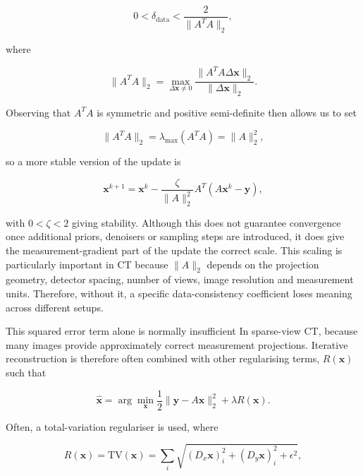 \begin{equation}
0<\delta_{\mathrm{data}}<\frac{2}{\|A^TA\|_2},
\label{eq:data_step_stability}
\end{equation}

where 

\begin{equation}
\|A^TA\|_2
=
\max_{\Delta\mathbf{x}\neq 0}
\frac{
\|A^TA\Delta\mathbf{x}\|_2
}{
\|\Delta\mathbf{x}\|_2
}.
\label{eq:operator_norm_definition}
\end{equation}

Observing that $A^TA$ is symmetric and positive semi-definite then allows us to set 

\begin{equation}
\|A^TA\|_2
=
\lambda_{\max}(A^TA)
=
\|A\|_2^2,
\label{eq:operator_norm_relation}
\end{equation}

so a more stable version of the update is

\begin{equation}
\mathbf{x}^{k+1}
=
\mathbf{x}^k
-
\frac{\zeta}{\|A\|_2^2}
A^T(A\mathbf{x}^k-\mathbf{y}),
\label{eq:scaled_data_consistency_update}
\end{equation}

with $0<\zeta<2$ giving stability. Although this does not guarantee convergence once additional priors, denoisers or sampling steps are introduced, it does give the measurement-gradient part of the update the correct scale. This scaling is particularly important in CT because $\|A\|_2$ depends on the projection geometry, detector spacing, number of views, image resolution and measurement units. Therefore, without it, a specific data-consistency coefficient loses meaning across different setups.

This squared error term alone is normally insufficient In sparse-view CT, because many images provide approximately correct measurement projections. Iterative reconstruction is therefore often combined with other regularising terms, $R(\mathbf{x})$ such that 

\begin{equation}
\hat{\mathbf{x}}
=
\arg\min_{\mathbf{x}}
\frac{1}{2}
\|\mathbf{y}-A\mathbf{x}\|_2^2
+
\lambda R(\mathbf{x}).
\label{eq:regularised_reconstruction_objective}
\end{equation}

Often, a total-variation regulariser is used, where

\begin{equation}
R(\mathbf{x})=\mathrm{TV}(\mathbf{x})
=
\sum_i
\sqrt{
(D_x\mathbf{x})_i^2
+
(D_y\mathbf{x})_i^2
+
\epsilon^2
},
\label{eq:total_variation_regulariser}
\end{equation}

